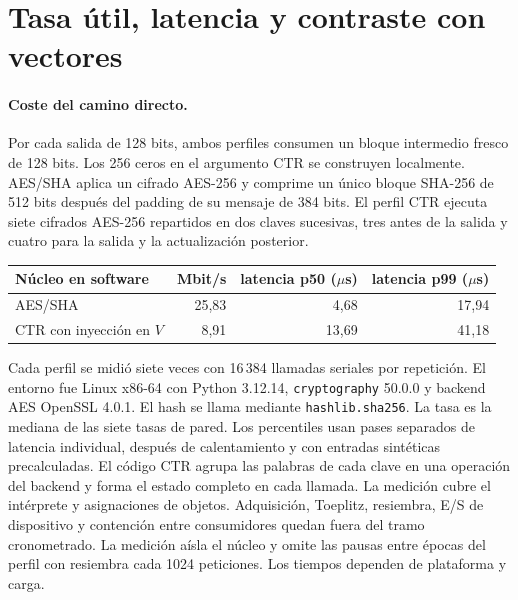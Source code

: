 \section{Tasa útil, latencia y contraste con vectores}
\label{sec:rates-checked}

\paragraph{Coste del camino directo.} Por cada salida de 128 bits, ambos perfiles consumen un bloque
intermedio fresco de 128 bits. Los 256 ceros en el argumento CTR se construyen localmente.
AES/SHA aplica un cifrado AES-256 y comprime un único bloque SHA-256 de 512 bits después del
padding de su mensaje de 384 bits. El perfil CTR ejecuta siete cifrados AES-256 repartidos en dos
claves sucesivas, tres antes de la salida y cuatro para la salida y la actualización posterior.

\begin{center}\small
\begin{tabular}{@{}lrrr@{}}\toprule
Núcleo en software & Mbit/s & latencia p50 ($\mu$s) & latencia p99 ($\mu$s)\\\midrule
AES/SHA & 25,83 & 4,68 & 17,94\\
CTR con inyección en $V$ & 8,91 & 13,69 & 41,18\\\bottomrule
\end{tabular}\end{center}
Cada perfil se midió siete veces con 16\,384 llamadas seriales por repetición. El entorno fue
Linux x86-64 con Python 3.12.14, \texttt{cryptography} 50.0.0 y backend AES OpenSSL 4.0.1. El hash se llama mediante
\texttt{hashlib.sha256}. La tasa es la mediana de las siete tasas de pared. Los percentiles
usan pases separados de latencia individual, después de calentamiento y con entradas sintéticas
precalculadas. El código CTR agrupa las palabras de cada clave en una operación del backend y
forma el estado completo en cada llamada. La medición cubre el intérprete y asignaciones de
objetos. Adquisición, Toeplitz, resiembra, E/S de dispositivo y contención entre consumidores quedan
fuera del tramo cronometrado. La medición aísla el núcleo y omite las pausas entre épocas del
perfil con resiembra cada 1024 peticiones. Los tiempos dependen de plataforma y carga.

